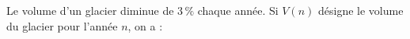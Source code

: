 
Le volume d'un glacier diminue de $3\,\%$ chaque année. Si $V(n)$ désigne le volume du glacier pour l'année $n$, on a :

\smallskip

